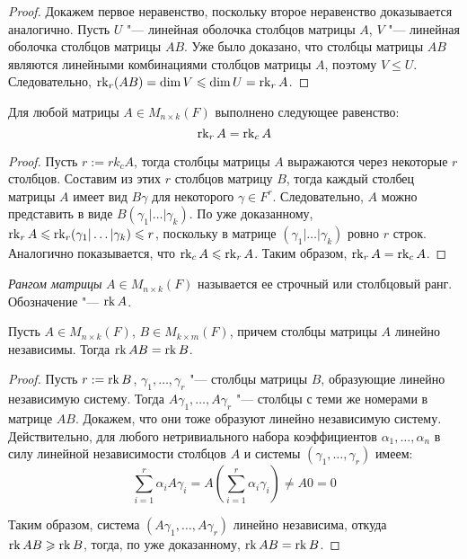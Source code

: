 \begin{proof}
	Докажем первое неравенство, поскольку второе неравенство доказывается аналогично. Пусть $U$ "--- линейная оболочка столбцов матрицы $A$, $V$ "--- линейная оболочка столбцов матрицы $AB$. Уже было доказано, что столбцы матрицы $AB$ являются линейными комбинациями столбцов матрицы $A$, поэтому $V \le U$. Следовательно, $\rk_r(AB) = \dim{V} \le \dim{U} \hm{=} \rk_rA$.
\end{proof}

\begin{theorem}
	Для любой матрицы $A \in M_{n \times k}(F)$ выполнено следующее равенство:
	\[\operatorname{rk}_rA = \operatorname{rk}_cA\]
\end{theorem}

\begin{proof}
	Пусть $r := rk_cA$, тогда столбцы матрицы $A$ выражаются через некоторые $r$ столбцов. Составим из этих $r$ столбцов матрицу $B$, тогда каждый столбец матрицы $A$ имеет вид $B\gamma$ для некоторого $\gamma \in F^r$. Следовательно, $A$ можно представить в виде $B(\gamma_1|\dots|\gamma_k)$. По уже доказанному, $\operatorname{rk}_rA \leqslant \operatorname{rk}_r(\gamma_1|\dots|\gamma_k) \leqslant r$, поскольку в матрице $(\gamma_1|\dots|\gamma_k)$ ровно $r$ строк. Аналогично показывается, что $\operatorname{rk}_cA \leqslant \operatorname{rk}_rA$. Таким образом, $\operatorname{rk}_rA = \operatorname{rk}_cA$.
\end{proof}

\begin{definition}
	\textit{Рангом матрицы} $A \in M_{n \times k}(F)$ называется ее строчный или столбцовый ранг. Обозначение "--- $\operatorname{rk}{A}$.
\end{definition}

\begin{proposition}
	Пусть $A \in M_{n \times k}(F)$, $B \in M_{k \times m}(F)$, причем столбцы матрицы $A$ линейно независимы. Тогда $\operatorname{rk}{AB} = \operatorname{rk}{B}$.
\end{proposition}

\begin{proof}
	Пусть $r := \operatorname{rk}{B}$, $\gamma_1, \dotsc, \gamma_r$ "--- столбцы матрицы $B$, образующие линейно независимую систему. Тогда $A\gamma_1, \dots, A\gamma_r$ "--- столбцы с теми же номерами в матрице $AB$. Докажем, что они тоже образуют линейно независимую систему. Действительно, для любого нетривиального набора коэффициентов $\alpha_1, \dotsc, \alpha_n$ в силу линейной независимости столбцов $A$ и системы $(\gamma_1, \dotsc, \gamma_r)$ имеем:
	\[\sum_{i = 1}^{r}\alpha_iA\gamma_i = A\left(\sum_{i = 1}^{r}\alpha_i\gamma_i\right) \ne A0 = 0\]
		
	Таким образом, система $(A\gamma_1, \dots, A\gamma_r)$ линейно независима, откуда $\operatorname{rk}{AB} \geqslant \operatorname{rk}{B}$, тогда, по уже доказанному, $\operatorname{rk}{AB} = \operatorname{rk}{B}$.
\end{proof}

